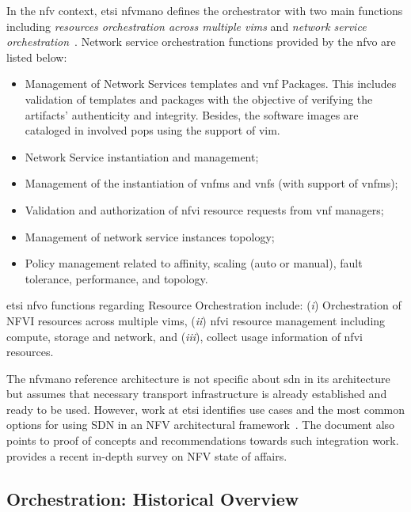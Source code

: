In the \gls{nfv} context, \gls{etsi} \gls{nfvmano} defines the orchestrator with two main functions including \textit{resources orchestration across multiple \glspl{vim}} and \textit{network service orchestration}~\cite{GSNFV-MAN001:2014}. Network service orchestration functions provided by the \gls{nfvo} are listed below:
\begin{itemize}
\item Management of Network Services templates and \gls{vnf} Packages. This includes validation of templates and packages with the objective of verifying the artifacts' authenticity and integrity. Besides, the software images are cataloged in involved \glspl{pop} using the support of \gls{vim}.
\item Network Service instantiation and management;
\item Management of the instantiation of \glspl{vnfm} and \glspl{vnf} (with support of \glspl{vnfm});
\item Validation and authorization of \gls{nfvi} resource requests from \gls{vnf} managers;
\item Management of network service instances topology;
\item Policy management related to affinity, scaling (auto or manual), fault tolerance, performance, and topology.
\end{itemize}

\gls{etsi} \gls{nfvo} functions regarding Resource Orchestration include: (\textit{i})  Orchestration of NFVI resources across multiple \glspl{vim}, (\textit{ii})  \gls{nfvi} resource management including compute, storage and network, and (\textit{iii}), collect usage information of \gls{nfvi} resources.

The \gls{nfvmano} reference architecture is not  specific about \gls{sdn} in its architecture but  assumes that necessary transport infrastructure is already established and ready to be used. However, work at \gls{etsi} identifies use cases and the most common options for using SDN in an NFV architectural framework~\cite{ETSINetworkFramework}. The document also points to  proof of concepts and recommendations towards such integration work.
\cite{nfv-survey18} provides a recent in-depth survey on NFV state of affairs. 

\subsection{Orchestration: Historical Overview}

